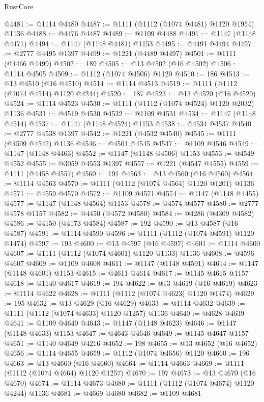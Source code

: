 \begin{lexlean}{RustCore}
\begin{coremodule}
@4481 := @1114 @4480
@4487 := @1111 (@1112 (@1074 @4481) @1120 @1954) @1136
@4488 := @4476 @4487
@4489 := @1109 @4488
@4491 := @1147 (@1148 @4471)
@4494 := @1147 (@1148 @4481) @1153
@4495 := @4491 @4494
@4497 := @2777 @4495 @1397
@4499 := @1221 (@4489 @4497)
@4501 := @1111 (@4466 @4499)
@4502 := 189
@4505 := @13 @4502 (@16 @4502)
@4506 := @1114 @4505
@4509 := @1112 (@1074 @4506) @1120
@4510 := 186
@4513 := @13 @4510 (@16 @4510)
@4514 := @1114 @4513
@4519 := @1111 (@1112 (@1074 @4514) @1120 @4244)
@4520 := 187
@4523 := @13 @4520 (@16 @4520)
@4524 := @1114 @4523
@4530 := @1111 (@1112 (@1074 @4524) @1120 @2032) @1136
@4531 := @4519 @4530
@4532 := @1109 @4531
@4534 := @1147 (@1148 @4514)
@4537 := @1147 (@1148 @4524) @1153
@4538 := @4534 @4537
@4540 := @2777 @4538 @1397
@4542 := @1221 (@4532 @4540)
@4545 := @1111 (@4509 @4542) @1136
@4546 := @4501 @4545
@4547 := @1109 @4546
@4549 := @1147 (@1148 @4463)
@4552 := @1147 (@1148 @4506) @1153
@4553 := @4549 @4552
@4555 := @3059 @4553 @1397
@4557 := @1221 (@4547 @4555)
@4559 := @1111 (@4458 @4557)
@4560 := 191
@4563 := @13 @4560 (@16 @4560)
@4564 := @1114 @4563
@4570 := @1111 (@1112 (@1074 @4564) @1120 @1201) @1136
@4571 := @4559 @4570
@4572 := @1109 @4571
@4574 := @1147 (@1148 @4455)
@4577 := @1147 (@1148 @4564) @1153
@4578 := @4574 @4577
@4580 := @2777 @4578 @1157
@4582 := @4450 (@4572 @4580)
@4584 := @4286 (@4309 @4582)
@4586 := @4150 (@4173 @4584)
@4587 := 192
@4590 := @13 @4587 (@16 @4587)
@4591 := @1114 @4590
@4596 := @1111 (@1112 (@1074 @4591) @1120 @1474)
@4597 := 193
@4600 := @13 @4597 (@16 @4597)
@4601 := @1114 @4600
@4607 := @1111 (@1112 (@1074 @4601) @1120 @1133) @1136
@4608 := @4596 @4607
@4609 := @1109 @4608
@4611 := @1147 (@1148 @4591)
@4614 := @1147 (@1148 @4601) @1153
@4615 := @4611 @4614
@4617 := @1145 @4615 @1157
@4618 := @1140 @4617
@4619 := 194
@4622 := @13 @4619 (@16 @4619)
@4623 := @1114 @4622
@4628 := @1111 (@1112 (@1074 @4623) @1120 @1474)
@4629 := 195
@4632 := @13 @4629 (@16 @4629)
@4633 := @1114 @4632
@4639 := @1111 (@1112 (@1074 @4633) @1120 @1257) @1136
@4640 := @4628 @4639
@4641 := @1109 @4640
@4643 := @1147 (@1148 @4623)
@4646 := @1147 (@1148 @4633) @1153
@4647 := @4643 @4646
@4649 := @1145 @4647 @1157
@4651 := @1140 @4649 @4216
@4652 := 198
@4655 := @13 @4652 (@16 @4652)
@4656 := @1114 @4655
@4659 := @1112 (@1074 @4656) @1120
@4660 := 196
@4663 := @13 @4660 (@16 @4660)
@4664 := @1114 @4663
@4669 := @1111 (@1112 (@1074 @4664) @1120 @1257)
@4670 := 197
@4673 := @13 @4670 (@16 @4670)
@4674 := @1114 @4673
@4680 := @1111 (@1112 (@1074 @4674) @1120 @4244) @1136
@4681 := @4669 @4680
@4682 := @1109 @4681

\end{coremodule}
\end{lexlean}
